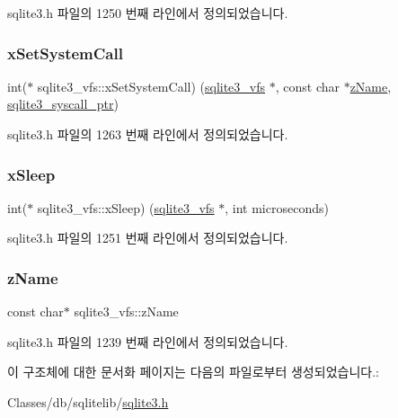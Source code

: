 sqlite3.\+h 파일의 1250 번째 라인에서 정의되었습니다.

\mbox{\label{structsqlite3__vfs_a444cd80f79ea4994f72551bb9f403866}} 
\subsubsection{\texorpdfstring{x\+Set\+System\+Call}{xSetSystemCall}}
{\footnotesize\ttfamily int($\ast$ sqlite3\+\_\+vfs\+::x\+Set\+System\+Call) (\hyperlink{structsqlite3__vfs}{sqlite3\+\_\+vfs} $\ast$, const char $\ast$\hyperlink{structsqlite3__vfs_a0f06a27ac2201ea04c0623ef19e5d73e}{z\+Name}, \hyperlink{sqlite3_8h_a99a6393e96d7095fa024de9c1257aa6f}{sqlite3\+\_\+syscall\+\_\+ptr})}



sqlite3.\+h 파일의 1263 번째 라인에서 정의되었습니다.

\mbox{\label{structsqlite3__vfs_abd36ce64a27bd6c1b57a6f2c7031ff65}} 
\subsubsection{\texorpdfstring{x\+Sleep}{xSleep}}
{\footnotesize\ttfamily int($\ast$ sqlite3\+\_\+vfs\+::x\+Sleep) (\hyperlink{structsqlite3__vfs}{sqlite3\+\_\+vfs} $\ast$, int microseconds)}



sqlite3.\+h 파일의 1251 번째 라인에서 정의되었습니다.

\mbox{\label{structsqlite3__vfs_a0f06a27ac2201ea04c0623ef19e5d73e}} 
\subsubsection{\texorpdfstring{z\+Name}{zName}}
{\footnotesize\ttfamily const char$\ast$ sqlite3\+\_\+vfs\+::z\+Name}



sqlite3.\+h 파일의 1239 번째 라인에서 정의되었습니다.



이 구조체에 대한 문서화 페이지는 다음의 파일로부터 생성되었습니다.\+:\begin{DoxyCompactItemize}
\item 
Classes/db/sqlitelib/\hyperlink{sqlite3_8h}{sqlite3.\+h}\end{DoxyCompactItemize}
